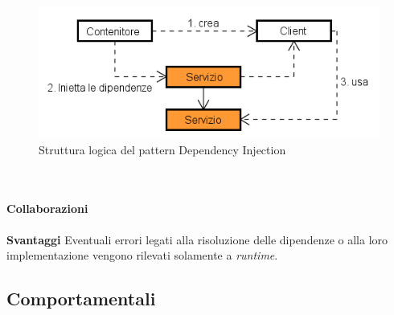 \label{Struttura logica del pattern Dependency Injection}
\begin{figure}
	\centering
	\includegraphics[scale=0.45]{UML/strutturaPattern/DependencyInjection.png}
	\caption{Struttura logica del pattern Dependency Injection}
\end{figure}
\\\\
\textbf{Collaborazioni}
\\\\
\textbf{Svantaggi}	Eventuali errori legati alla risoluzione delle dipendenze o alla loro implementazione vengono rilevati solamente a \textit{runtime}.


\subsection{Comportamentali}

